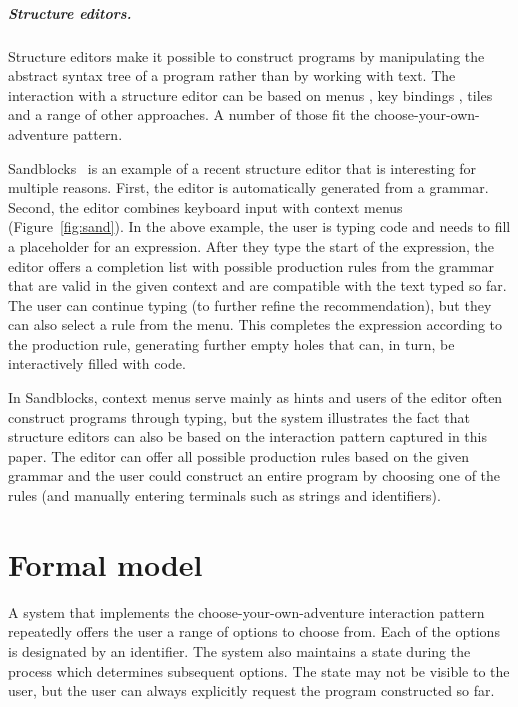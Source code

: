 \documentclass[anonymous, a4paper,UKenglish,cleveref, autoref, thm-restate]{lipics-v2021}
\begin{document}

\subparagraph{Structure editors.}
Structure editors make it possible to construct programs by manipulating the abstract syntax tree
of a program rather than by working with text. The interaction with a structure
editor can be based on menus \cite{teitelbaum-1981-synth}, key bindings \cite{weber-2017-editors},
tiles~\cite{moon-2022-tylr} and a range of other approaches. A number of those fit
the choose-your-own-adventure pattern.

Sandblocks~\cite{beckmann-2023-all} is an example of a recent structure editor that is interesting
for multiple reasons. First, the editor is automatically generated from a grammar. Second, the
editor combines keyboard input with context menus (Figure~\ref{fig:sand}). In the above example,
the user is typing code and needs to fill a placeholder for an expression. After they type the
start of the expression, the editor offers a completion list with possible production rules from
the grammar that are valid in the given context and are compatible with the text typed so far. The
user can continue typing (to further refine the recommendation), but they can also select a rule
from the menu. This completes the expression according to the production rule, generating further
empty holes that can, in turn, be interactively filled with code.

In Sandblocks, context menus serve mainly as hints and users of the editor often
construct programs through typing, but the system illustrates the fact that structure editors
can also be based on the interaction pattern captured in this paper. The editor can offer
all possible production rules based on the given grammar and the user could construct an
entire program by choosing one of the rules (and manually entering terminals such as
strings and identifiers).


\section{Formal model}
\label{sec:calculus}

A system that implements the choose-your-own-adventure interaction pattern repeatedly offers
the user a range of options to choose from. Each of the options is designated by an identifier.
The system also maintains a state during the process which determines subsequent options. The state
may not be visible to the user, but the user can always explicitly request the program constructed
so far.
\end{document}
